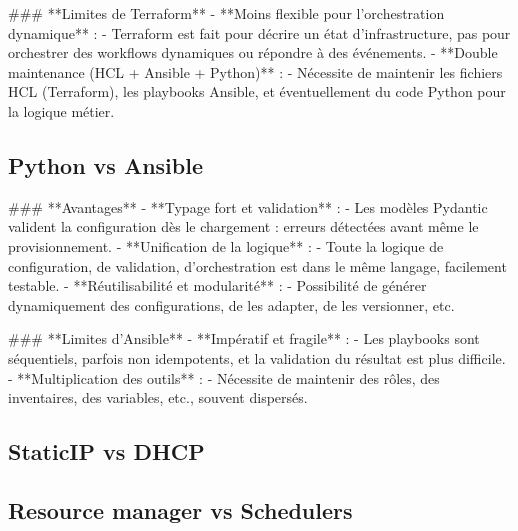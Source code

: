 ### **Limites de Terraform**
- **Moins flexible pour l'orchestration dynamique** :
- Terraform est fait pour décrire un état d'infrastructure, pas pour orchestrer des workflows dynamiques ou répondre à des événements.
- **Double maintenance (HCL + Ansible + Python)** :
- Nécessite de maintenir les fichiers HCL (Terraform), les playbooks Ansible, et éventuellement du code Python pour la logique métier.

\subsection{Python vs Ansible}

### **Avantages**
- **Typage fort et validation** :
- Les modèles Pydantic valident la configuration dès le chargement : erreurs détectées avant même le provisionnement.
- **Unification de la logique** :
- Toute la logique de configuration, de validation, d'orchestration est dans le même langage, facilement testable.
- **Réutilisabilité et modularité** :
- Possibilité de générer dynamiquement des configurations, de les adapter, de les versionner, etc.

### **Limites d'Ansible**
- **Impératif et fragile** :
- Les playbooks sont séquentiels, parfois non idempotents, et la validation du résultat est plus difficile.
- **Multiplication des outils** :
- Nécessite de maintenir des rôles, des inventaires, des variables, etc., souvent dispersés.

\subsection{StaticIP vs DHCP}

\subsection{Resource manager vs Schedulers}